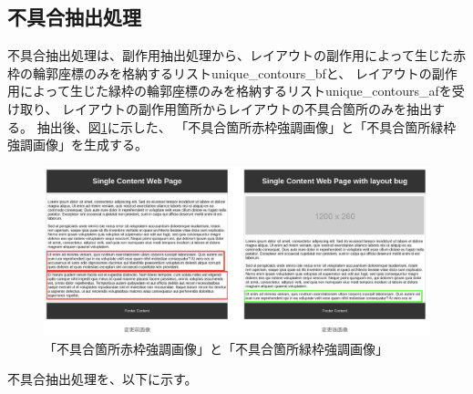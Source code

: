 \subsection{不具合抽出処理}\label{subsec:Layout_bug_extraction}
不具合抽出処理は、副作用抽出処理から、レイアウトの副作用によって生じた赤枠の輪郭座標のみを格納するリストunique\_contours\_bfと、
レイアウトの副作用によって生じた緑枠の輪郭座標のみを格納するリストunique\_contours\_afを受け取り、
レイアウトの副作用箇所からレイアウトの不具合箇所のみを抽出する。
抽出後、図\ref{fig: img_bug}に示した、
「不具合箇所赤枠強調画像」と「不具合箇所緑枠強調画像」を生成する。
\par
\begin{figure}[tp]
    \begin{center}
        \includegraphics[width=1.0\columnwidth]{image/4_img_buf.png}
        \caption{「不具合箇所赤枠強調画像」と「不具合箇所緑枠強調画像」}
        \label{fig: img_bug}
    \end{center}
\end{figure}
\par
不具合抽出処理を、以下に示す。

